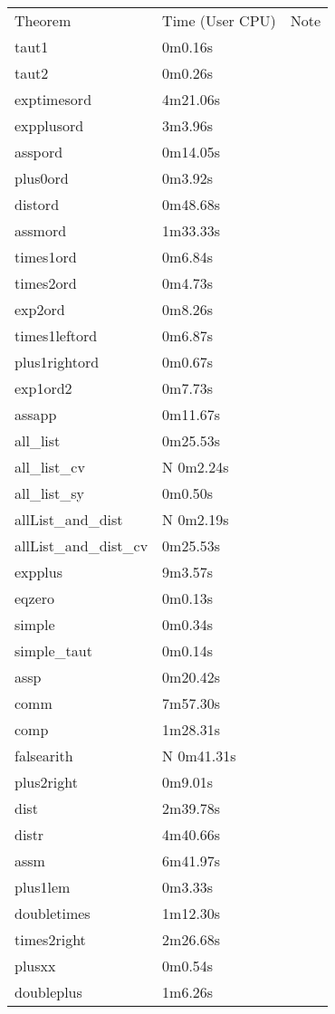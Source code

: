 \begin{center}\begin{supertabular}[t]{llp{2in}} 
Theorem & Time (User CPU) & Note\\ 

taut1 & 0m0.16s & \\
taut2 & 0m0.26s & \\
exptimesord & 4m21.06s & \\
expplusord & 3m3.96s & \\
asspord & 0m14.05s & \\
plus0ord & 0m3.92s & \\
distord & 0m48.68s & \\
assmord & 1m33.33s & \\
times1ord & 0m6.84s & \\
times2ord & 0m4.73s & \\
exp2ord & 0m8.26s & \\
times1leftord & 0m6.87s & \\
plus1rightord & 0m0.67s & \\
exp1ord2 & 0m7.73s & \\
assapp & 0m11.67s & \\
all\_list & 0m25.53s & \\
all\_list\_cv & N 0m2.24s & \\
all\_list\_sy & 0m0.50s & \\
allList\_and\_dist & N 0m2.19s & \\
allList\_and\_dist\_cv & 0m25.53s & \\
expplus & 9m3.57s & \\
eqzero & 0m0.13s & \\
simple & 0m0.34s & \\
simple\_taut & 0m0.14s & \\
assp & 0m20.42s & \\
comm & 7m57.30s & \\
comp & 1m28.31s & \\
falsearith & N 0m41.31s & \\
plus2right & 0m9.01s & \\
dist & 2m39.78s & \\
distr & 4m40.66s & \\
assm & 6m41.97s & \\
plus1lem & 0m3.33s & \\
doubletimes & 1m12.30s & \\
times2right & 2m26.68s & \\
plusxx & 0m0.54s & \\
doubleplus & 1m6.26s & \\

\end{supertabular}
\end{center}
